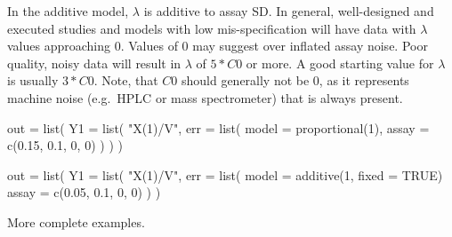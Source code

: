 \documentclass[
]{book}
\newenvironment{Shaded}{\begin{snugshade}}{\end{snugshade}}
\newcommand{\AttributeTok}[1]{\textcolor[rgb]{0.77,0.63,0.00}{#1}}
\newcommand{\ConstantTok}[1]{\textcolor[rgb]{0.00,0.00,0.00}{#1}}
\newcommand{\DecValTok}[1]{\textcolor[rgb]{0.00,0.00,0.81}{#1}}
\newcommand{\FloatTok}[1]{\textcolor[rgb]{0.00,0.00,0.81}{#1}}
\newcommand{\FunctionTok}[1]{\textcolor[rgb]{0.00,0.00,0.00}{#1}}
\newcommand{\NormalTok}[1]{#1}
\newcommand{\OtherTok}[1]{\textcolor[rgb]{0.56,0.35,0.01}{#1}}
\newcommand{\StringTok}[1]{\textcolor[rgb]{0.31,0.60,0.02}{#1}}
\begin{document}
In the additive model, \(\lambda\) is additive to assay SD. In general,
well-designed and executed studies and models with low mis-specification will have data with \(\lambda\) values approaching 0. Values of 0 may suggest over inflated assay noise. Poor quality, noisy data will result in \(\lambda\) of \(5*C0\) or more. A good starting value for \(\lambda\) is usually \(3*C0\). Note, that \(C0\)
should generally not be 0, as it represents machine noise (e.g.~HPLC or
mass spectrometer) that is always present.

\begin{Shaded}
\begin{Highlighting}[]
\NormalTok{out }\OtherTok{=} \FunctionTok{list}\NormalTok{(}
  \AttributeTok{Y1 =} \FunctionTok{list}\NormalTok{(}
    \StringTok{"X(1)/V"}\NormalTok{,}
    \AttributeTok{err =} \FunctionTok{list}\NormalTok{(}
      \AttributeTok{model =} \FunctionTok{proportional}\NormalTok{(}\DecValTok{1}\NormalTok{),}
      \AttributeTok{assay =} \FunctionTok{c}\NormalTok{(}\FloatTok{0.15}\NormalTok{, }\FloatTok{0.1}\NormalTok{, }\DecValTok{0}\NormalTok{, }\DecValTok{0}\NormalTok{)}
\NormalTok{    )}
\NormalTok{  )}
\NormalTok{)}
\end{Highlighting}
\end{Shaded}

\begin{Shaded}
\begin{Highlighting}[]
\NormalTok{out }\OtherTok{=} \FunctionTok{list}\NormalTok{(}
  \AttributeTok{Y1 =} \FunctionTok{list}\NormalTok{(}
    \StringTok{"X(1)/V"}\NormalTok{,}
    \AttributeTok{err =} \FunctionTok{list}\NormalTok{(}
      \AttributeTok{model =} \FunctionTok{additive}\NormalTok{(}\DecValTok{1}\NormalTok{, }\AttributeTok{fixed =} \ConstantTok{TRUE}\NormalTok{)}
      \AttributeTok{assay =} \FunctionTok{c}\NormalTok{(}\FloatTok{0.05}\NormalTok{, }\FloatTok{0.1}\NormalTok{, }\DecValTok{0}\NormalTok{, }\DecValTok{0}\NormalTok{)}
\NormalTok{    )}
\NormalTok{)}
\end{Highlighting}
\end{Shaded}

More complete examples.
\end{document}
